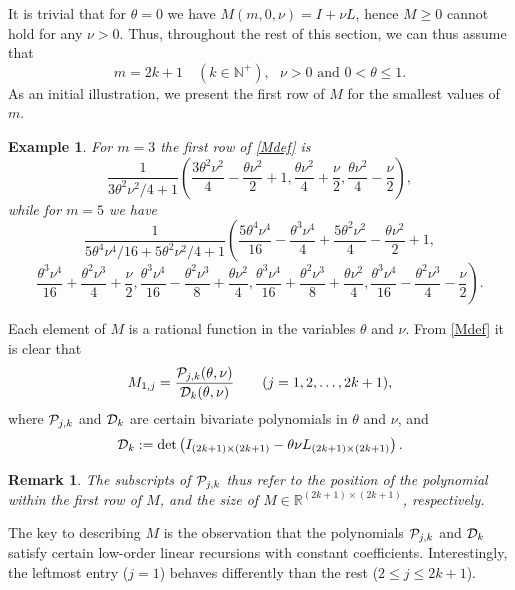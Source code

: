 \documentclass[a4paper]{article}
\newtheorem{remark}{Remark}
\newtheorem{example}{Example}
\newcommand{\te}{\theta}
\newcommand{\nplus}{\mathbb{N}^+}
\newcommand{\cP}{{\cal{P}}}
\newcommand{\cD}{{\cal{D}}}
\begin{document}
It is trivial that for $\te=0$ we have $M(m,0,\nu)=I+\nu L$, hence $M\ge 0$ cannot hold for any $\nu>0$. Thus, throughout the rest of this section, we can thus assume that 
\[
\boxed{ 
m=2k+1\quad (k\in\nplus), \ \ \ \nu>0 \text{\ \  and\ \  } 0<\te\le 1.}
\]
As an initial illustration, we present the first row of $M$ for the smallest values of $m$. 
\begin{example}\label{example1} 
For $m=3$ the first row of \eqref{Mdef} is 
\[
\frac{1}{{3 \theta ^2 \nu ^2}/{4}+1}\left(\frac{3 \theta ^2 \nu ^2}{4}-\frac{\theta  \nu ^2}{2}+1,\frac{\theta  \nu ^2}{4}+\frac{\nu }{2},\frac{\theta  \nu ^2}{4}-\frac{\nu }{2}\right),
\]
while for $m=5$ we have 
\[
\frac{1}{{5 \theta ^4 \nu ^4}/{16}+{5 \theta ^2 \nu ^2}/{4}+1}\left(\frac{5 \theta ^4 \nu ^4}{16}-\frac{\theta ^3 \nu ^4}{4}+\frac{5 \theta ^2 \nu ^2}{4}-\frac{\theta  \nu ^2}{2}+1,\right.
\]
\[
\left.\frac{\theta ^3 \nu
   ^4}{16}+\frac{\theta ^2 \nu ^3}{4}+\frac{\nu }{2},\frac{\theta ^3 \nu ^4}{16}-\frac{\theta ^2 \nu ^3}{8}+\frac{\theta  \nu ^2}{4},\frac{\theta ^3
   \nu ^4}{16}+\frac{\theta ^2 \nu ^3}{8}+\frac{\theta  \nu ^2}{4},\frac{\theta ^3 \nu ^4}{16}-\frac{\theta ^2 \nu ^3}{4}-\frac{\nu }{2}\right).
\]

\end{example}


Each element of $M$ is a rational function in the variables $\te$ and $\nu$. From \eqref{Mdef} it is clear that 
\[
M_{1,j}=\frac{\cP_{j,k}(\te,\nu) }{\cD_k(\te,\nu)}\quad\quad(j=1,2,\ldots,2k+1),
\]
where $\cP_{j,k}$ and $\cD_{k}$ are certain bivariate polynomials in $\te$ and $\nu$, and 
\begin{equation}\label{dendet}
\cD_k:=\det\left(I_{(2k+1)\times(2k+1)}-\te\nu L_{(2k+1)\times(2k+1)}\right).
\end{equation}
\begin{remark}
The subscripts of $\cP_{j,k}$ thus refer to the position of the polynomial within the first row of $M$, and the size of $M\in\mathbb{R}^{(2k+1)\times(2k+1)}$, respectively.
\end{remark}


The key to describing $M$ is the observation that the polynomials $\cP_{j,k}$ and $\cD_{k}$ satisfy certain low-order linear recursions with constant coefficients. Interestingly, the leftmost entry ($j=1$) behaves differently than the rest ($2\le j\le 2k+1$).
\end{document}

